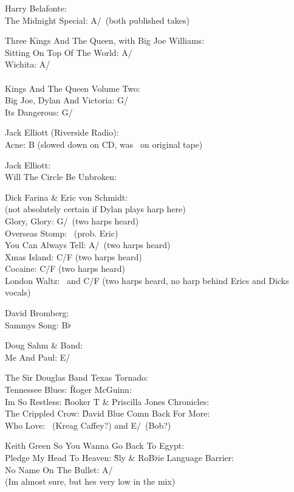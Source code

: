 \begin{articlelayout}
Harry Belafonte: \\ The Midnight Special: A/\D\ (both published takes)


Three Kings And The Queen, with Big Joe Williams: \\ Sitting On Top Of
The World: A/\D\\ Wichita: A/\D\\
\\
Kings And The Queen Volume Two: \\ Big Joe, Dylan And Victoria: G/\C\\
Its Dangerous: G/\C


Jack Elliott (Riverside Radio): \\ Acne: B (slowed down on CD, was
\C\ on original tape)


Jack Elliott: \\ Will The Circle Be Unbroken: \D


Dick Farina \& Eric von Schmidt: \\ (not absolutely certain if Dylan
plays harp here)\\ Glory, Glory: G/\C\ (two harps heard)\\ Overseas
Stomp: \C\ (prob. Eric)\\ You Can Always Tell: A/\D\ (two harps heard)\\
Xmas Island: C/F (two harps heard)\\ Cocaine: C/F (two harps heard)\\
London Waltz: \C\ and C/F (two harps heard, no harp behind Erics and
Dicks vocals)


David Bromberg: \\ Sammys Song: B$\flat$


Doug Sahm \& Band: \\ Me And Paul: E/\A


The Sir Douglas Band Texas Tornado: \\ Tennessee Blues: \G


Roger McGuinn: \\ Im So Restless: \G


Booker T \& Priscilla Jones Chronicles: \\ The Crippled Crow: \G


David Blue Comn Back For More: \\ Who Love: \E\ (Kreag Caffey?) and
E/\A\ (Bob?)


Keith Green So You Wanna Go Back To Egypt: \\ Pledge My Head To
Heaven: \G


Sly \& RoB$\flat$ie Language Barrier: \\ No Name On The Bullet: A/\G\\
(Im almost sure, but hes very low in the mix)



\end{articlelayout}
